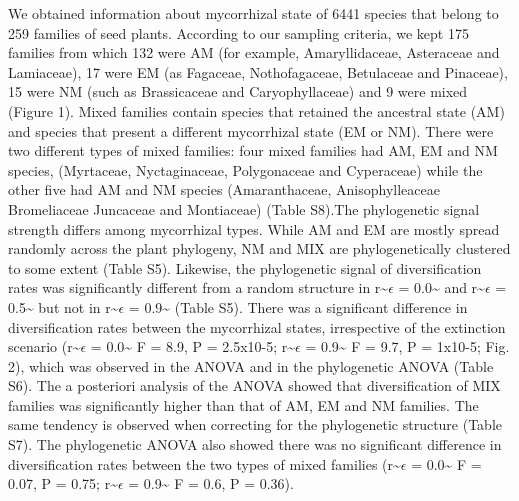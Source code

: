 \documentclass[12pt,]{article}
\begin{document}
We obtained information about mycorrhizal state of 6441 species that
belong to 259 families of seed plants. According to our sampling
criteria, we kept 175 families from which 132 were AM (for example,
Amaryllidaceae, Asteraceae and Lamiaceae), 17 were EM (as Fagaceae,
Nothofagaceae, Betulaceae and Pinaceae), 15 were NM (such as
Brassicaceae and Caryophyllaceae) and 9 were mixed (Figure 1). Mixed
families contain species that retained the ancestral state (AM) and
species that present a different mycorrhizal state (EM or NM). There
were two different types of mixed families: four mixed families had AM,
EM and NM species, (Myrtaceae, Nyctaginaceae, Polygonaceae and
Cyperaceae) while the other five had AM and NM species (Amaranthaceae,
Anisophylleaceae Bromeliaceae Juncaceae and Montiaceae) (Table S8).The
phylogenetic signal strength differs among mycorrhizal types. While AM
and EM are mostly spread randomly across the plant phylogeny, NM and MIX
are phylogenetically clustered to some extent (Table S5). Likewise, the
phylogenetic signal of diversification rates was significantly different
from a random structure in r\textasciitilde{}\(\epsilon\) =
0.0\textasciitilde{} and r\textasciitilde{}\(\epsilon\) =
0.5\textasciitilde{} but not in r\textasciitilde{}\(\epsilon\) =
0.9\textasciitilde{} (Table S5). There was a significant difference in
diversification rates between the mycorrhizal states, irrespective of
the extinction scenario (r\textasciitilde{}\(\epsilon\) =
0.0\textasciitilde{} F = 8.9, P = 2.5x10-5;
r\textasciitilde{}\(\epsilon\) = 0.9\textasciitilde{} F = 9.7, P =
1x10-5; Fig. 2), which was observed in the ANOVA and in the phylogenetic
ANOVA (Table S6). The a posteriori analysis of the ANOVA showed that
diversification of MIX families was significantly higher than that of
AM, EM and NM families. The same tendency is observed when correcting
for the phylogenetic structure (Table S7). The phylogenetic ANOVA also
showed there was no significant difference in diversification rates
between the two types of mixed families (r\textasciitilde{}\(\epsilon\)
= 0.0\textasciitilde{} F = 0.07, P = 0.75;
r\textasciitilde{}\(\epsilon\) = 0.9\textasciitilde{} F = 0.6, P =
0.36).
\end{document}
